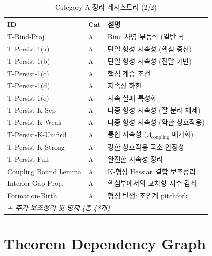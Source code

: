 \begin{table}[p]
\centering
\caption{Category A 정리 레지스트리 (2/2)}
\label{tab:theorem-registry-2}
\small
\begin{tabular}{llp{7.5cm}}
\hline
\textbf{ID} & \textbf{Cat} & \textbf{설명} \\
\hline
T-Bind-Proj & A & Bind 사영 부등식 (일반 $\tau$) \\
T-Persist-1(a) & A & 단일 형성 지속성 (핵심 중첩) \\
T-Persist-1(b) & A & 단일 형성 지속성 (전달 기반) \\
T-Persist-1(c) & A & 핵심 계승 조건 \\
T-Persist-1(d) & A & 지속성 하한 \\
T-Persist-1(e) & A & 지속 실패 특성화 \\
T-Persist-K-Sep & A & 다중 형성 지속성 (잘 분리 체제) \\
T-Persist-K-Weak & A & 다중 형성 지속성 (약한 상호작용) \\
T-Persist-K-Unified & A & 통합 지속성 ($\Lambda_{\mathrm{coupling}}$ 매개화) \\
T-Persist-K-Strong & A & 강한 상호작용 국소 안정성 \\
T-Persist-Full & A & 완전한 지속성 정리 \\
\hline
Coupling Bound Lemma & A & K-형성 Hessian 결합 보조정리 \\
Interior Gap Prop. & A & 핵심부에서의 교차항 지수 감쇠 \\
Formation-Birth & A & 형성 탄생: 초임계 pitchfork \\
\hline
\multicolumn{3}{l}{\textit{+ 추가 보조정리 및 명제 (총 48개)}} \\
\hline
\end{tabular}
\end{table}


\section{Theorem Dependency Graph}
\label{app:theorem-dag}


